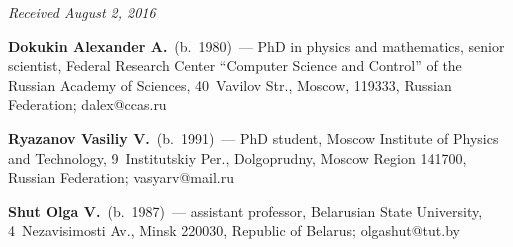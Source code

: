 \vspace*{-3pt}

\hfill{\small\textit{Received August 2, 2016}}

\Contr

\noindent
\textbf{Dokukin Alexander A.}\ (b.\ 1980)~--- 
PhD in physics and mathematics, senior scientist, Federal Research Center 
``Computer Science and Control'' of the Russian Academy of Sciences,
 40~Vavilov Str., Moscow, 119333, Russian Federation; \mbox{dalex@ccas.ru} 
 
 \vspace*{3pt}

\noindent
\textbf{Ryazanov Vasiliy V.}\ (b.\ 1991)~--- 
PhD student, Moscow Institute of Physics and Technology, 9~Institutskiy Per., 
Dolgoprudny, Moscow Region 141700, Russian Federation; \mbox{vasyarv@mail.ru}

\vspace*{3pt}


\noindent
\textbf{Shut Olga V.}\ (b.\ 1987)~--- 
assistant professor, Belarusian State University, 4~Nezavisimosti Av., 
Minsk 220030, Republic of Belarus; \mbox{olgashut@tut.by}


\label{end\stat}


\renewcommand{\bibname}{\protect\rm Литература} 